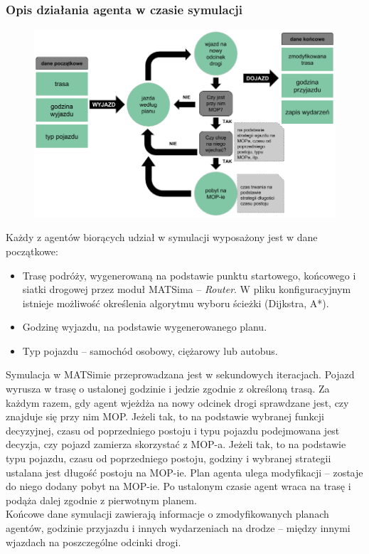 \subsubsection{Opis działania agenta w czasie symulacji}
    \begin{figure}[h]
        \includegraphics[width=\textwidth]{images/mopsim/agent-dzialanie.png}
    \end{figure}
Każdy z agentów biorących udział w symulacji wyposażony jest w dane początkowe:
\begin{itemize}
\item Trasę podróży, wygenerowaną na podstawie punktu startowego, końcowego i siatki drogowej przez moduł MATSima -- \textit{Router}. W pliku konfiguracyjnym istnieje możliwość określenia algorytmu wyboru ścieżki (Dijkstra, A*).
\item Godzinę wyjazdu, na podstawie wygenerowanego planu.
\item Typ pojazdu -- samochód osobowy, ciężarowy lub autobus.
\end{itemize}
Symulacja w MATSimie przeprowadzana jest w sekundowych iteracjach. Pojazd wyrusza w trasę o ustalonej godzinie i jedzie zgodnie z określoną trasą. Za każdym razem, gdy agent wjeżdża na nowy odcinek drogi sprawdzane jest, czy znajduje się przy nim MOP. Jeżeli tak, to na podstawie wybranej funkcji decyzyjnej, czasu od poprzedniego postoju i typu pojazdu podejmowana jest decyzja, czy pojazd zamierza skorzystać z MOP-a. Jeżeli tak, to na podstawie typu pojazdu, czasu od poprzedniego postoju, godziny i wybranej strategii ustalana jest długość postoju na MOP-ie. Plan agenta ulega modyfikacji -- zostaje do niego dodany pobyt na MOP-ie. Po ustalonym czasie agent wraca na trasę i podąża dalej zgodnie z pierwotnym planem. \\
Końcowe dane symulacji zawierają informacje o zmodyfikowanych planach agentów, godzinie przyjazdu i innych wydarzeniach na drodze -- między innymi wjazdach na poszczególne odcinki drogi.
